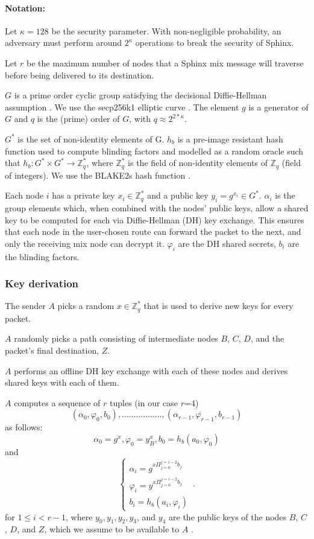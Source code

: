 \paragraph{Notation:}Let $\kappa=128$ be the security parameter. With non-negligible probability, an adversary must perform around $2^\kappa$ operations to break the security of Sphinx.

Let $r$ be the maximum number of nodes that a Sphinx mix message will traverse before being delivered to its destination.

$G$ is a prime order cyclic group satisfying the decisional Diffie-Hellman assumption \cite{Boneh_1998}. We use the secp256k1 elliptic curve \cite{secp}. The element $g$ is a generator of $G$ and $q$ is the (prime) order of $G$, with $q\approx2^{2*\kappa}$.

$G^*$ is the set of non-identity elements of G. $h_b$ is a pre-image resistant hash function used to compute blinding factors and modelled as a random oracle such that
$h_b:G^*\times G^*\rightarrow\mathbb{Z}^*_q$, where $\mathbb{Z}^*_q$ is the field of non-identity elements of $\mathbb{Z}_q$ (field of integers). We use the BLAKE2s hash function \cite{blake2}.

Each node $i$ has a private key $x_{i}\in \mathbb{Z}^*_q$ and a public key $y_{i}=g^{x_{i}}\in G^*$.
$\alpha_i$ is the group elements which, when combined with the nodes’ public keys, allow a shared key to be computed for each via Diffie-Hellman (DH) key exchange. This ensures that each node in the user-chosen route can forward the packet to the next, and only the receiving mix node can decrypt it.
$\varphi_i$ are the DH shared secrets, $b_i$ are the blinding factors.

\subsubsection{Key derivation}
\label{sec:sphinx:keyderivation}
The sender $A$ picks a random $x\in \mathbb{Z}^*_q$ that is used to derive new keys for every packet.

$A$ randomly picks a path consisting of intermediate nodes $B$, $C$, $D$, and the packet's final destination, $Z$.

$A$ performs an offline DH key exchange with each of these nodes and derives shared keys with each of them.

$A$ computes a sequence of $r$ tuples (in our case $r$=4)  $$(\alpha_0,\varphi_0,b_0),.................,(\alpha_{r-1},\varphi_{r-1},b_{r-1})$$ as follows:
$$\alpha_0=g^x,\varphi_0=y^x_B,b_0=h_b(a_0,\varphi_0)$$
and
\begin{equation}
    \begin{cases}
        \alpha_i=g^{x\Pi_{j=0}^{j=i-2}b_j}  \\
        \varphi_i=y^{x\Pi_{j=0}^{j=i-2}b_j} \\
        b_i=h_b(a_i,\varphi_i)
    \end{cases}\,.
    \label{eq:1}
\end{equation}
for $1\le i < r-1$, where $y_0,y_1, y_2, y_3$, and $y_4$ are the public keys of the nodes $B$, $C$, $D$, and $Z$, which we assume to be available to $A$ .

